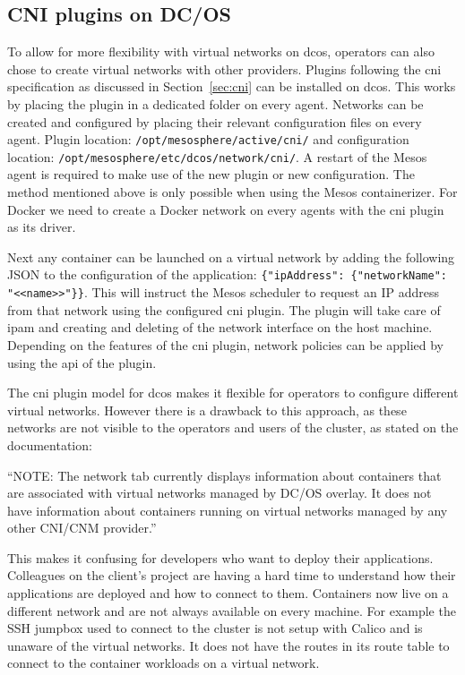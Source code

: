 \subsection{CNI plugins on DC/OS}
\label{subsec:dcos-cni}
To allow for more flexibility with virtual networks on \gls{dcos}, operators can also chose to create virtual networks with other providers. Plugins following the \gls{cni} specification as discussed in Section~\ref{sec:cni} can be installed on \gls{dcos}. This works by placing the plugin in a dedicated folder on every agent. Networks can be created and configured by placing their relevant configuration files on every agent. Plugin location: \texttt{/opt/mesosphere/active/cni/} and configuration location: \texttt{/opt/mesosphere/etc/dcos/network/cni/}. A restart of the Mesos agent is required to make use of the new plugin or new configuration. The method mentioned above is only possible when using the Mesos containerizer. For Docker we need to create a Docker network on every agents with the \gls{cni} plugin as its driver.

Next any container can be launched on a virtual network by adding the following JSON to the configuration of the application: \texttt{\{"ipAddress": \{"networkName": "<<name>>"\}\}}. This will instruct the Mesos scheduler to request an IP address from that network using the configured \gls{cni} plugin. The plugin will take care of \gls{ipam} and creating and deleting of the network interface on the host machine. Depending on the features of the \gls{cni} plugin, network policies can be applied by using the \gls{api} of the plugin.

The \gls{cni} plugin model for \gls{dcos} makes it flexible for operators to configure different virtual networks. However there is a drawback to this approach, as these networks are not visible to the operators and users of the cluster, as stated on the documentation\cite{dcos_sdn}:
\begin{displayquote}
    ``NOTE: The network tab currently displays information about containers that are associated with virtual networks managed by DC/OS overlay. It does not have information about containers running on virtual networks managed by any other CNI/CNM provider.'' 
\end{displayquote}
This makes it confusing for developers who want to deploy their applications. Colleagues on the client's project are having a hard time to understand how their applications are deployed and how to connect to them. Containers now live on a different network and are not always available on every machine. For example the SSH jumpbox used to connect to the cluster is not setup with Calico and is unaware of the virtual networks. It does not have the routes in its route table to connect to the container workloads on a virtual network. 

